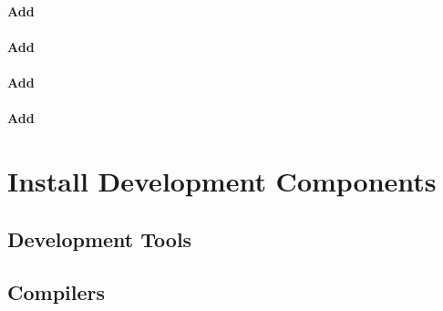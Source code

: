 \documentclass[letterpaper]{article}
\begin{document}
\vspace*{0.4cm}

\paragraph{Add \clustershell{}}


\paragraph{Add \genders{}}


\clearpage
\paragraph{Add \conman{}} \label{sec:add_conman}


\paragraph{Add \nhc{}} \label{sec:add_nhc}



%
%


\section{Install \OHPC{} Development Components}


\subsection{Development Tools} \label{sec:install_dev_tools}


\vspace*{-0.15cm}
\subsection{Compilers} \label{sec:install_compilers}

\end{document}
